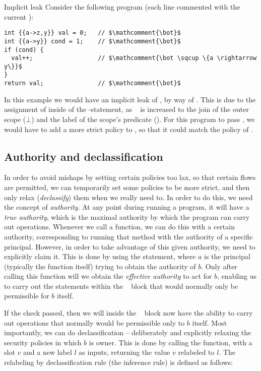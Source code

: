 \begin{example}{Implicit leak}\label{dlm:ex:implicit_leak}
  Consider the following program (each line commented with the current \dlmpc):
  \begin{lstlisting}[style=dlmc]
int {{a->z,y}} val = 0;   // $\mathcomment{\bot}$
int {{a->y}} cond = 1;    // $\mathcomment{\bot}$
if (cond) {
  val++;                  // $\mathcomment{\bot \sqcup \{a \rightarrow y\}}$
}
return val;               // $\mathcomment{\bot}$
  \end{lstlisting}
  In this example we would have an implicit leak of , by way of .
  This is due to the assignment of  inside of the -statement, as \dlmpc~ is increased to the join of the outer scope ($\bot$) and the label of the scope's predicate ().
  For this program to pass \thetool, we would have to add a more strict policy to , so that it could match the policy of .
\end{example}

\subsection{Authority and declassification}\label{dlm:auth_and_declass}
In order to avoid mishaps by setting certain policies too lax, so that certain flows are permitted, we can temporarily set some policies to be more strict, and then only relax (\emph{declassify}) them when we really need to.
In order to do this, we need the concept of \emph{authority}.
At any point during running a program, it will have a \emph{true authority}, which is the maximal authority by which the program can carry out operations.
Whenever we call a function, we can do this with a certain authority, corresponding to running that method with the authority of a specific principal.
However, in order to take advantage of this given authority, we need to explicitly claim it.
This is done by using the \dlmactsfor{} statement, where $a$ is the principal (typically the function itself) trying to obtain the authority of $b$.
Only after calling this function will we obtain the \emph{effective authority} to act for $b$, enabling us to carry out the statements within the \dlmactsfor~ block that would normally only be permissible for $b$ itself.

If the check passed, then we will inside the \dlmactsfor~ block now have the ability to carry out operations that normally would be permissible only to $b$ itself.
Most importantly, we can do declassification -- deliberately and explicitly relaxing the security policies in which $b$ is owner.
This is done by calling the \dlmdeclassify{} function, with a slot $v$ and a new label $l$ as inputs, returning the value $v$ relabeled to $l$.
The relabeling by declassification rule (the inference rule) is defined as follows:

